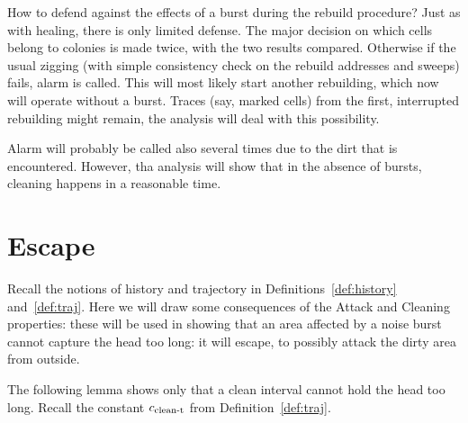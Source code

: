\documentclass[12pt]{memoir}
\newcommand{\cns}[1]{c_{\textrm{\upshape #1}}}
\newcommand{\cCleanT}{\cns{clean-t}}
\begin{document}
How to defend against the effects of a burst during the rebuild procedure?
Just as with healing, there is only limited defense.
The major decision on which cells belong to colonies is made twice, with the
two results compared.
Otherwise if the usual zigging (with simple consistency check on the rebuild addresses
and sweeps) fails, alarm is called.
This will most likely start another rebuilding, which now will operate without a burst.
Traces (say, marked cells) from the first, interrupted rebuilding might remain,
the analysis will deal with this possibility.

Alarm will probably be called also several times due to the dirt that is encountered.
However, tha analysis will show that in the absence of bursts, cleaning happens
in a reasonable time.


\section{Escape}

Recall the notions of history and trajectory in Definitions~\ref{def:history} 
and~\ref{def:traj}.
Here we will draw some consequences of the Attack and Cleaning properties:
these will be used in showing that an area affected by a noise burst cannot
capture the head too long: it will escape, to possibly attack the dirty area
from outside.

The following lemma shows only that a clean interval cannot hold the head 
too long.
Recall the constant \( \cCleanT \) from Definition~\ref{def:traj}.
\end{document}

